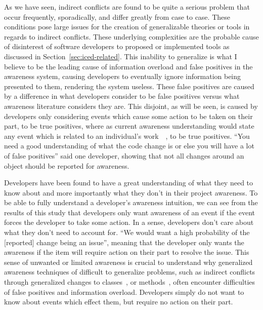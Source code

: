 As we have seen, indirect conflicts are found to be quite a serious problem that occur frequently,
sporadically, and differ greatly from case to case. These conditions pose large issues for the creation of generalizable theories
or tools in regards to indirect conflicts. These underlying complexities are the probable cause of disinterest of software developers
to proposed or implemented tools as discussed in Section~\ref{sec:iced-related}. This inability to generalize is what I believe to be the
leading cause of information overload and false positives in the awareness system, causing developers to eventually ignore 
information being presented to them, rendering the system useless. These false positives are caused by a difference in what
developers consider to be false positives versus what awareness literature considers they are. This disjoint, as will
be seen, is caused by developers only considering events which cause some action to be taken on their part, to be true positives,
where as current awareness understanding would state any event which is related to an individual's 
work~\cite{Herbsleb06collaborationin}~\cite{Cataldo:2008:SCF}, to be true positives.
``You need a good understanding of what the code change is or else you will have a lot of false positives'' said one developer,
showing that not all changes around an object should be reported for awareness.

Developers have been found to have a great understanding of what they need to know about and more importantly what they don't in
their project awareness. To be able to fully understand a developer's awareness intuition, we can see from the results of this study that
developers only want awareness of an event if the event forces the developer to take some action. In a sense, developers
don't care about what they don't need to account for. ``We would want a high probability of the [reported] change being an issue'', meaning
that the developer only wants the awareness if the item will require action on their part to resolve the issue.
This sense of unwanted or limited awareness is crucial to understand why generalized
awareness techniques of difficult to generalize problems, such as indirect conflicts through generalized changes to 
classes~\cite{Sarma:2007:TSA}, or methods~\cite{Trainer:2005:BGT,Servant:2010:CPI}, often encounter difficulties of false
positives and information overload. 
Developers simply do not want to know about events which effect them, but require no action on their part. 

